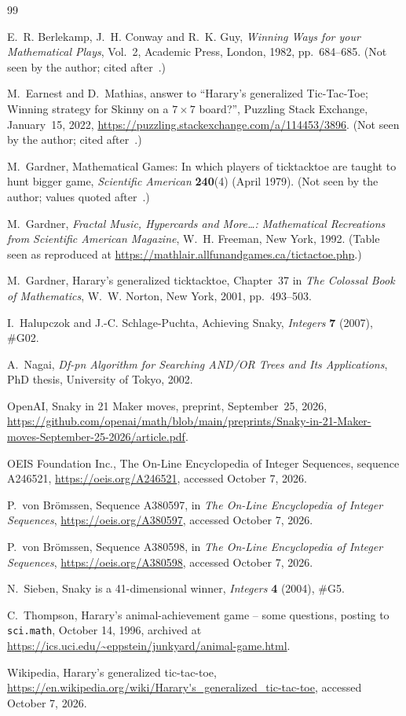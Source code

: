 \documentclass[11pt]{article}
\theoremstyle{definition}
\theoremstyle{remark}
\begin{document}
\begin{thebibliography}{99}
\raggedright

E.~R. Berlekamp, J.~H. Conway and R.~K. Guy,
\emph{Winning Ways for your Mathematical Plays}, Vol.~2, Academic Press, London, 1982,
pp.~684--685. (Not seen by the author; cited after~\cite{Tho96,Wiki}.)

M.~Earnest and D.~Mathias, answer to ``Harary's generalized Tic-Tac-Toe; Winning strategy for
Skinny on a $7\times 7$ board?'', Puzzling Stack Exchange, January~15, 2022,
\url{https://puzzling.stackexchange.com/a/114453/3896}. (Not seen by the author; cited
after~\cite{Wiki}.)

M.~Gardner, Mathematical Games: In which players of ticktacktoe are taught to hunt bigger game,
\emph{Scientific American} \textbf{240}(4) (April 1979). (Not seen by the author; values quoted
after~\cite{Wiki}.)

M.~Gardner, \emph{Fractal Music, Hypercards and More\ldots: Mathematical Recreations from Scientific
American Magazine}, W.~H. Freeman, New York, 1992. (Table seen as reproduced at
\url{https://mathlair.allfunandgames.ca/tictactoe.php}.)

M.~Gardner, Harary's generalized ticktacktoe, Chapter~37 in \emph{The Colossal Book of
Mathematics}, W.~W. Norton, New York, 2001, pp.~493--503.

I.~Halupczok and J.-C. Schlage-Puchta, Achieving Snaky, \emph{Integers} \textbf{7} (2007), \#G02.

A.~Nagai, \emph{Df-pn Algorithm for Searching AND/OR Trees and Its Applications}, PhD thesis,
University of Tokyo, 2002.

OpenAI, Snaky in 21 Maker moves, preprint, September~25, 2026,
\url{https://github.com/openai/math/blob/main/preprints/Snaky-in-21-Maker-moves-September-25-2026/article.pdf}.

OEIS Foundation Inc., The On-Line Encyclopedia of Integer Sequences, sequence A246521,
\url{https://oeis.org/A246521}, accessed October 7, 2026.

P.~von Br\"omssen, Sequence A380597, in \emph{The On-Line Encyclopedia of Integer Sequences},
\url{https://oeis.org/A380597}, accessed October 7, 2026.

P.~von Br\"omssen, Sequence A380598, in \emph{The On-Line Encyclopedia of Integer Sequences},
\url{https://oeis.org/A380598}, accessed October 7, 2026.

N.~Sieben, Snaky is a 41-dimensional winner, \emph{Integers} \textbf{4} (2004), \#G5.

C.~Thompson, Harary's animal-achievement game -- some questions, posting to \texttt{sci.math},
October 14, 1996, archived at \url{https://ics.uci.edu/~eppstein/junkyard/animal-game.html}.

Wikipedia, Harary's generalized tic-tac-toe,
\url{https://en.wikipedia.org/wiki/Harary's_generalized_tic-tac-toe}, accessed October 7, 2026.

\end{thebibliography}
\end{document}
